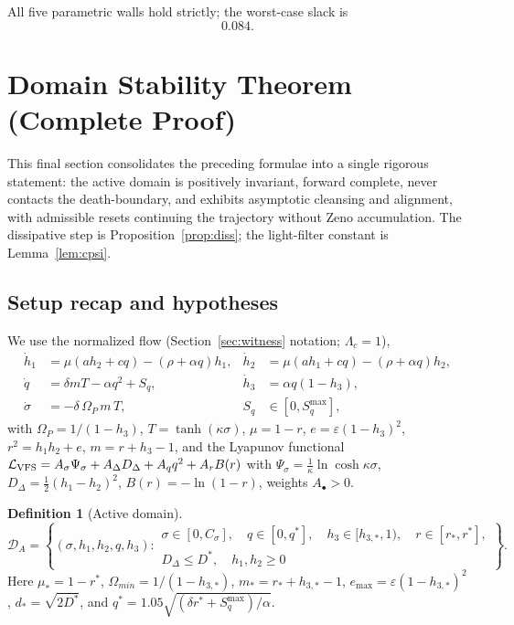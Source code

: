 \documentclass[11pt,a4paper]{article}
\newcommand{\DA}{\mathcal D_A}
\newcommand{\LV}{\mathcal L_{\rm VFS}}
\newcommand{\Sq}{S_q}
\newcommand{\Om}{\Omega_P}
\newcommand{\Psis}{\Psi_\sigma}
\theoremstyle{plain}
\theoremstyle{definition}
\newtheorem{definition}{Definition}
\theoremstyle{remark}
\begin{document}
All five parametric walls hold strictly; the worst-case slack is
\begin{equation}
  0.084.
\end{equation}

\section{Domain Stability Theorem (Complete Proof)}

This final section consolidates the preceding formulae into a single rigorous
statement: the active domain is positively invariant, forward complete, never
contacts the death-boundary, and exhibits asymptotic cleansing and alignment,
with admissible resets continuing the trajectory without Zeno accumulation. The
dissipative step is Proposition~\ref{prop:diss}; the light-filter constant is
Lemma~\ref{lem:cpsi}.

\subsection{Setup recap and hypotheses}
We use the normalized flow (Section~\ref{sec:witness} notation; $\Lambda_c=1$),
\begin{equation}\label{eq:flow2}
\begin{aligned}
  \dot h_1&=\mu(ah_2+cq)-(\rho+\alpha q)h_1, &
  \dot h_2&=\mu(ah_1+cq)-(\rho+\alpha q)h_2,\\
  \dot q&=\delta mT-\alpha q^2+\Sq, &
  \dot h_3&=\alpha q(1-h_3),\\
  \dot\sigma&=-\delta\,\Om\,m\,T, &
  \Sq&\in[0,\Sq^{\max}],
\end{aligned}
\end{equation}
with $\Om=1/(1-h_3)$, $T=\tanh(\kappa\sigma)$, $\mu=1-r$, $e=\varepsilon(1-h_3)^2$,
$r^2=h_1h_2+e$, $m=r+h_3-1$, and the Lyapunov functional
$\LV=A_\sigma\Psis+A_\Delta D_\Delta+A_qq^2+A_rB(r)$ with
$\Psis=\tfrac1\kappa\ln\cosh\kappa\sigma$, $D_\Delta=\tfrac12(h_1-h_2)^2$,
$B(r)=-\ln(1-r)$, weights $A_\bullet>0$.

\begin{definition}[Active domain]\label{def:DAfull}
\begin{equation*}
\DA=\left\{(\sigma,h_1,h_2,q,h_3):
\begin{array}{l}
\sigma\in[0,C_\sigma],\quad q\in[0,q^*],\quad h_3\in[h_{3,*},1),\quad r\in[r_*,r^*],\\
D_\Delta\le D^*,\quad h_1,h_2\ge0
\end{array}
\right\}.
\end{equation*}
Here $\mu_*=1-r^*$, $\Omega_{min}=1/(1-h_{3,*})$, $m_*=r_*+h_{3,*}-1$,
$e_{\max}=\varepsilon(1-h_{3,*})^2$, $d_*=\sqrt{2D^*}$, and
$q^*=1.05\sqrt{(\delta r^*+\Sq^{\max})/\alpha}$.
\end{definition}
\end{document}
